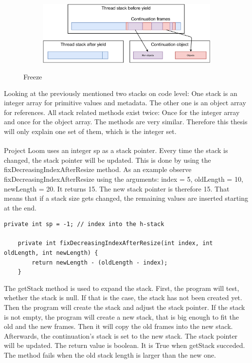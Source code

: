 \begin{figure}[h]
    \centering
    \begin{subfigure}[b]{1.0\textwidth}
        \includegraphics[width=1.0\linewidth]{img/freeze-jvmls-2019.png}
    \end{subfigure}
    \caption{Freeze \cite{OpenJDK:jvmls:2019}}
    \label{freeze}
\end{figure}

Looking at the previously mentioned two stacks on code level: One stack is an integer array for primitive values and metadata. The other one is an object array for references. All stack related methods exist twice: Once for the integer array and once for the object array. The methods are very similar. Therefore this thesis will only explain one set of them, which is the integer set.
\\
\\
Project Loom uses an integer sp as a stack pointer. Every time the stack is changed, the stack pointer will be updated. This is done by using the fixDecreasingIndexAfterResize method. As an example observe fixDecreasingIndexAfterResize using the arguments: index = 5, oldLength = 10, newLength = 20. It returns 15. The new stack pointer is therefore 15. That means that if a stack size gets changed, the remaining values are inserted starting at the end.

\begin{lstlisting}[language=custom-java]
    private int sp = -1; // index into the h-stack

    private int fixDecreasingIndexAfterResize(int index, int oldLength, int newLength) {
        return newLength - (oldLength - index);
    }
\end{lstlisting}

The getStack method is used to expand the stack. First, the program will test, whether the stack is null. If that is the case, the stack has not been created yet. Then the program will create the stack and adjust the stack pointer. If the stack is not empty, the program will create a new stack, that is big enough to fit the old and the new frames. Then it will copy the old frames into the new stack. Afterwards, the continuation's stack is set to the new stack. The stack pointer will be updated. The return value is boolean. It is True when getStack succeded. The method fails when the old stack length is larger than the new one.

